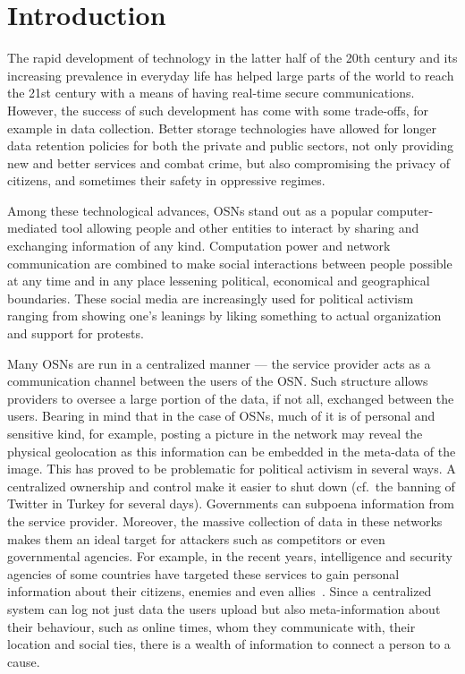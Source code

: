 \section{Introduction}
\label{Introduction}
The rapid development of technology in the latter half of the
20th century and its increasing prevalence in
everyday life has helped large parts of the world to reach the
21st century with a means of having real-time secure
communications.  However, the success of such development has come
with some trade-offs, for example in data collection. Better storage
technologies have allowed for longer data retention policies for both
the private and public sectors, not only providing new and better
services and combat crime, but also compromising the privacy of
citizens, and sometimes their safety in oppressive regimes.

Among these technological advances, \acp{OSN} stand out as a popular
computer-mediated tool allowing people and other entities to interact
by sharing and exchanging information of any kind. Computation power
and network communication are combined to make social interactions
between people possible at any time and in any place lessening
political, economical and geographical boundaries. These social media
are increasingly used for political activism ranging from showing
one's leanings by liking something to actual organization and support for
protests.

Many \acp{OSN} are run in a centralized manner --- the service
provider acts as a communication channel between the users of the
\ac{OSN}. Such structure allows providers to oversee a large portion
of the data, if not all, exchanged between the users. Bearing in mind
that in the case of \acp{OSN}, much of it is of personal and sensitive
kind, for example, posting a picture in the network may reveal the
physical geolocation as this information can be embedded in the
meta-data of the image. This has proved to be problematic for
political activism in several ways. A centralized ownership and
control make it easier to shut down (cf.\ the banning of Twitter in
Turkey for several days). Governments can subpoena 
information from the service provider.  Moreover, the massive
collection of data in these networks makes them an ideal target for
attackers such as competitors or even governmental agencies. For
example, in the recent years, intelligence and security agencies of
some countries have targeted these services to gain personal
information about their citizens, enemies and even
allies~\cite{Prism}. Since a centralized system can log not just data
the users upload but also meta-information about their behaviour, such
as online times, whom they communicate with, their location and social
ties, there is a wealth of information to connect a person to a cause.

